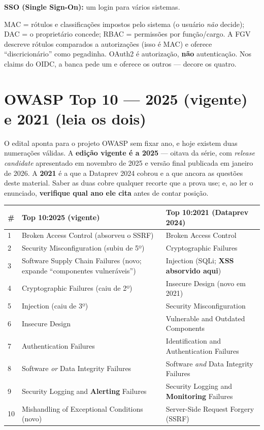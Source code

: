 \textbf{SSO (Single Sign-On):} um login para vários sistemas.

\begin{pegadinha}
MAC = rótulos e classificações impostos pelo sistema (o usuário \emph{não}
decide); DAC = o proprietário concede; RBAC = permissões por função/cargo. A
FGV descreve rótulos comparados a autorizações (isso é MAC) e oferece
``discricionário'' como pegadinha. OAuth2 é autorização, \textbf{não}
autenticação. Nos claims do OIDC, a banca pede um e oferece os outros ---
decore os quatro.
\end{pegadinha}

\section{OWASP Top 10 --- 2025 (vigente) e 2021 (leia os dois)}

O edital aponta para o projeto OWASP sem fixar ano, e hoje existem duas
numerações válidas. A \textbf{edição vigente é a 2025} --- oitava da série,
com \emph{release candidate} apresentado em novembro de 2025 e versão final
publicada em janeiro de 2026. A \textbf{2021} é a que a Dataprev 2024 cobrou e
a que ancora as questões deste material. Saber as duas cobre qualquer recorte
que a prova use; e, ao ler o enunciado, \textbf{verifique qual ano ele cita}
antes de contar posição.

\begin{center}
\begin{tabular}{@{}p{1.3cm}p{5.3cm}p{5.3cm}@{}}
\toprule
\# & \textbf{Top 10:2025} (vigente) & \textbf{Top 10:2021} (Dataprev 2024) \\
\midrule
1 & Broken Access Control (absorveu o SSRF) & Broken Access Control \\
2 & Security Misconfiguration (subiu de 5º) & Cryptographic Failures \\
3 & Software Supply Chain Failures (novo; expande ``componentes vulneráveis'') & Injection (SQLi; \textbf{XSS absorvido aqui}) \\
4 & Cryptographic Failures (caiu de 2º) & Insecure Design (novo em 2021) \\
5 & Injection (caiu de 3º) & Security Misconfiguration \\
6 & Insecure Design & Vulnerable and Outdated Components \\
7 & Authentication Failures & Identification and Authentication Failures \\
8 & Software \emph{or} Data Integrity Failures & Software \emph{and} Data Integrity Failures \\
9 & Security Logging and \textbf{Alerting} Failures & Security Logging and \textbf{Monitoring} Failures \\
10 & Mishandling of Exceptional Conditions (novo) & Server-Side Request Forgery (SSRF) \\
\bottomrule
\end{tabular}
\end{center}

